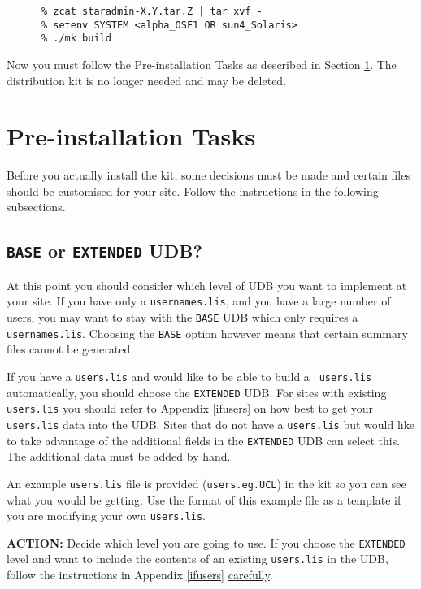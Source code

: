 \begin{verbatim}
      % zcat staradmin-X.Y.tar.Z | tar xvf -
      % setenv SYSTEM <alpha_OSF1 OR sun4_Solaris>
      % ./mk build
\end{verbatim}

Now you must follow the Pre-installation Tasks as described in Section
\ref{preinstall}.  The distribution kit is no longer needed and may be
deleted. 

\section{Pre-installation Tasks}
\label{preinstall}

Before you actually install the kit, some decisions must be made and 
certain files should be customised for your site. 
Follow the instructions in the following subsections.

\subsection{{\tt BASE} or {\tt EXTENDED} UDB?}

At this point you should consider which level of UDB you want to implement
at your site. If you have only a {\tt usernames.lis}, and you have a large
number of users, you may want to stay with the {\tt BASE} UDB which only
requires a {\tt usernames.lis}. Choosing the {\tt BASE} option however
means that certain summary files cannot be generated. 

If you have a {\tt users.lis} and would like to be able to build a {\tt
users.lis} automatically, you should choose the {\tt EXTENDED} UDB. For
sites with existing {\tt users.lis} you should refer to Appendix
\ref{ifusers} on how best to get your {\tt users.lis} data into the UDB.
Sites that do not have a {\tt users.lis} but would like to take advantage
of the additional fields in the {\tt EXTENDED} UDB can select this. The
additional data must be added by hand. 

An example {\tt users.lis} file is provided ({\tt users.eg.UCL}) in the
kit so you can see what you would be getting. Use the format of this
example file as a template if you are modifying your own {\tt users.lis}. 

{\large\bf ACTION:} Decide which level you are going to use. If you choose
the {\tt EXTENDED} level and want to include the contents of an existing
{\tt users.lis} in the UDB, follow the instructions in Appendix
\ref{ifusers} \underline{carefully}. 

